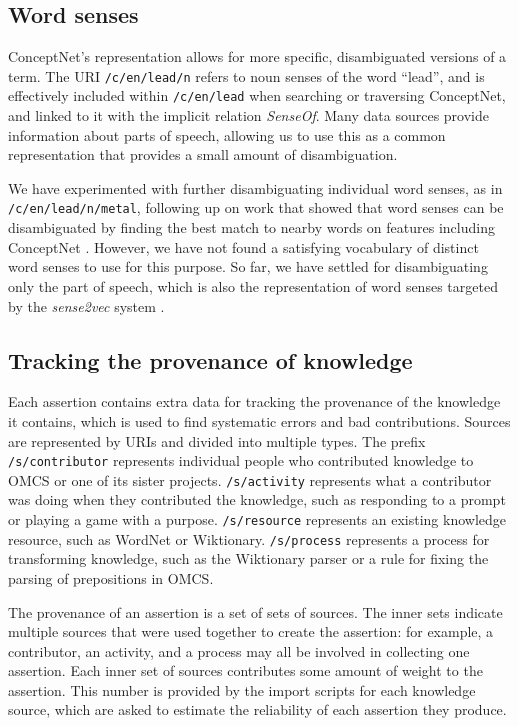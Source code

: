 \documentclass[letterpaper]{article}
\begin{document}
\subsection{Word senses}\label{word-senses}

ConceptNet's representation allows for more specific, disambiguated
versions of a term. The URI \texttt{/c/en/lead/n} refers to noun senses
of the word ``lead'', and is effectively included within
\texttt{/c/en/lead} when searching or traversing ConceptNet, and
linked to it with the implicit relation \emph{SenseOf}. Many data
sources provide information about parts of speech, allowing us to use
this as a common representation that provides a small amount of
disambiguation.

We have experimented with further disambiguating individual word senses, as in
\texttt{/c/en/lead/n/metal}, following up on work that showed that word senses
can be disambiguated by finding the best match to nearby words on features
including ConceptNet \cite{havasi2010coarse}. However, we have not found a
satisfying vocabulary of distinct word senses to use for this purpose. So far,
we have settled for disambiguating only the part of speech, which is also the
representation of word senses targeted by the \emph{sense2vec} system
\cite{trask2015sense2vec}.


\subsection{Tracking the provenance of knowledge}\label{provenance}

Each assertion contains extra data for tracking the provenance of the
knowledge it contains, which is used to find systematic errors and bad
contributions. Sources are represented by URIs and divided into multiple
types. The prefix \texttt{/s/contributor} represents individual people
who contributed knowledge to OMCS or one of its sister projects.
\texttt{/s/activity} represents what a contributor was doing when they
contributed the knowledge, such as responding to a prompt or playing a
game with a purpose. \texttt{/s/resource} represents an existing
knowledge resource, such as WordNet or Wiktionary. \texttt{/s/process}
represents a process for transforming knowledge, such as the Wiktionary
parser or a rule for fixing the parsing of prepositions in OMCS.

The provenance of an assertion is a set of sets of sources. The inner
sets indicate multiple sources that were used together to create the
assertion: for example, a contributor, an activity, and a process may
all be involved in collecting one assertion. Each inner set of sources
contributes some amount of weight to the assertion. This number is
provided by the import scripts for each knowledge source, which are
asked to estimate the reliability of each assertion they produce.
\end{document}
